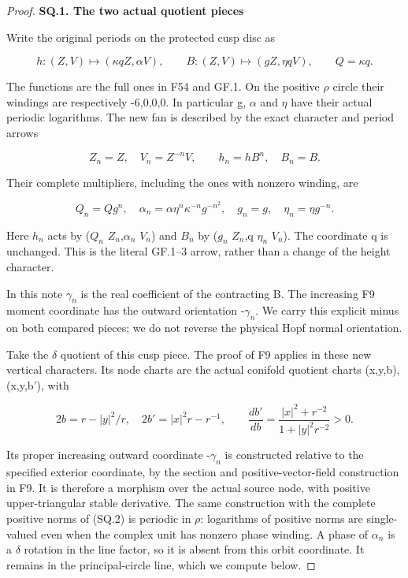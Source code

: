 \begin{proof}
\par

\medskip\noindent\textbf{SQ.1. The two actual quotient pieces}

\par\nobreak

Write the original periods on the protected cusp disc as

\[
 h:(Z,V)\mapsto(\kappa qZ,\alpha V),\qquad
 B:(Z,V)\mapsto(gZ,\eta qV),\qquad Q=\kappa q.
                                                        \tag{SQ.1}
\]

The functions are the full ones in F54 and GF.1. On the positive \(\rho\)
circle their windings are respectively -6,0,0,0. In particular g,
\(\alpha\) and \(\eta\) have their actual periodic logarithms. The new fan is
described by the exact character and period arrows

\[
 Z_n=Z,\quad V_n=Z^{-n}V,\qquad h_n=hB^n,\quad B_n=B.
\]

Their complete multipliers, including the ones with nonzero winding,
are

\[
 Q_n=Qg^n,\quad
 \alpha_n=\alpha\eta^n\kappa^{-n}g^{-n^2},\quad
 g_n=g,\quad\eta_n=\eta g^{-n}.                       \tag{SQ.2}
\]

Here \(h_{n}\) acts by (\(Q_{n}\) \(Z_{n}\),\(\alpha_{n}\) \(V_{n}\)) and \(B_{n}\) by
(\(g_{n}\) \(Z_{n}\),q \(\eta_{n}\) \(V_{n}\)). The coordinate q is unchanged. This is the
literal GF.1--3 arrow, rather than a change of the height character.

In this note \(\gamma_{n}\) is the real coefficient of the contracting B.
The increasing F9 moment coordinate has the outward orientation
-\(\gamma_{n}\). We carry this explicit minus on both compared pieces;
we do not reverse the physical Hopf normal orientation.

Take the \(\delta\) quotient of this cusp piece. The proof of F9 applies
in these new vertical characters. Its node charts are the actual
conifold quotient charts (x,y,b),(x,y,b'), with

\[
 2b=r-|y|^2/r,\quad 2b'=|x|^2r-r^{-1},\qquad
 \frac{db'}{db}=\frac{|x|^2+r^{-2}}{1+|y|^2r^{-2}}>0.    \tag{SQ.3}
\]

Its proper increasing outward coordinate -\(\gamma_{n}\) is constructed relative to the
specified exterior coordinate, by the section and positive-vector-field
construction in F9. It is therefore a morphism over the actual source
node, with positive upper-triangular stable derivative. The same
construction with the complete positive norms of (SQ.2) is periodic
in \(\rho\): logarithms of positive norms are single-valued even when the
complex unit has nonzero phase winding. A phase of \(\alpha_{n}\) is a \(\delta\)
rotation in the line factor, so it is absent from this orbit coordinate.
It remains in the principal-circle line, which we compute below.


\end{proof}
